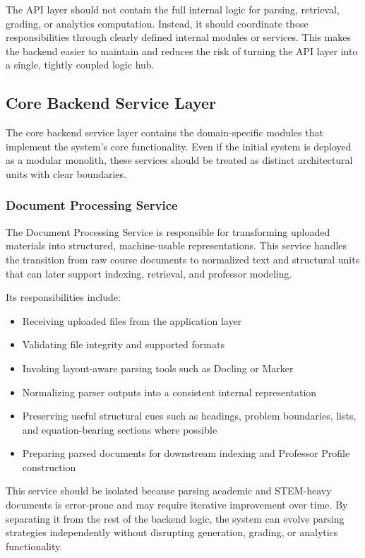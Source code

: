 \documentclass[11pt]{article}
\begin{document}
The API layer should not contain the full internal logic for parsing, retrieval, grading, or analytics computation. Instead, it should coordinate those responsibilities through clearly defined internal modules or services. This makes the backend easier to maintain and reduces the risk of turning the API layer into a single, tightly coupled logic hub.

\subsection{Core Backend Service Layer}
The core backend service layer contains the domain-specific modules that implement the system's core functionality. Even if the initial system is deployed as a modular monolith, these services should be treated as distinct architectural units with clear boundaries.

\subsubsection{Document Processing Service}
The Document Processing Service is responsible for transforming uploaded materials into structured, machine-usable representations. This service handles the transition from raw course documents to normalized text and structural units that can later support indexing, retrieval, and professor modeling.

Its responsibilities include:
\begin{itemize}
\item Receiving uploaded files from the application layer
\item Validating file integrity and supported formats
\item Invoking layout-aware parsing tools such as Docling or Marker
\item Normalizing parser outputs into a consistent internal representation
\item Preserving useful structural cues such as headings, problem boundaries, lists, and equation-bearing sections where possible
\item Preparing parsed documents for downstream indexing and Professor Profile construction
\end{itemize}

This service should be isolated because parsing academic and STEM-heavy documents is error-prone and may require iterative improvement over time. By separating it from the rest of the backend logic, the system can evolve parsing strategies independently without disrupting generation, grading, or analytics functionality.
\end{document}
